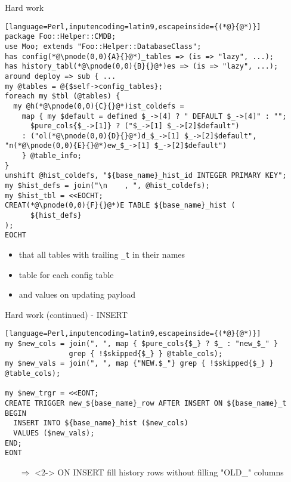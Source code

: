 \documentclass[ngerman,xcolor={table,dvipsnames},smaller,compress,hyperref={bookmarks,colorlinks}]{beamer}%
\begin{document}
\begin{frame}[fragile]{}
\begin{block}{Hard work}
\scriptsize
\begin{lstlisting}[language=Perl,inputencoding=latin9,escapeinside={(*@}{@*)}]
package Foo::Helper::CMDB;
use Moo; extends "Foo::Helper::DatabaseClass";
has config(*@\pnode(0,0){A}{}@*)_tables => (is => "lazy", ...);
has history_tabl(*@\pnode(0,0){B}{}@*)es => (is => "lazy", ...);
around deploy => sub { ...
my @tables = @{$self->config_tables};
foreach my $tbl (@tables) {
  my @h(*@\pnode(0,0){C}{}@*)ist_coldefs =
    map { my $default = defined $_->[4] ? " DEFAULT $_->[4]" : "";
      $pure_cols{$_->[1]} ? ("$_->[1] $_->[2]$default")
	: ("ol(*@\pnode(0,0){D}{}@*)d_$_->[1] $_->[2]$default", "n(*@\pnode(0,0){E}{}@*)ew_$_->[1] $_->[2]$default")
    } @table_info;
}
unshift @hist_coldefs, "${base_name}_hist_id INTEGER PRIMARY KEY";
my $hist_defs = join("\n    , ", @hist_coldefs);
my $hist_tbl = <<EOCHT;
CREAT(*@\pnode(0,0){F}{}@*)E TABLE ${base_name}_hist (
      ${hist_defs}
);
EOCHT
\end{lstlisting}
\end{block}

\begin{itemize}
\item<2-> that  all tables with trailing \texttt{\_t} in their names
\item<3->   table for each config table
\item<4->   and  values on updating payload
\end{itemize}
\end{frame}

\begin{frame}[fragile]{}
\begin{block}{Hard work (continued) - INSERT}
\scriptsize
\begin{lstlisting}[language=Perl,inputencoding=latin9,escapeinside={(*@}{@*)}]
my $new_cols = join(", ", map { $pure_cols{$_} ? $_ : "new_$_" }
               grep { !$skipped{$_} } @table_cols);
my $new_vals = join(", ", map {"NEW.$_"} grep { !$skipped{$_} } @table_cols);

my $new_trgr = <<EONT;
CREATE TRIGGER new_${base_name}_row AFTER INSERT ON ${base_name}_t
BEGIN
  INSERT INTO ${base_name}_hist ($new_cols)
  VALUES ($new_vals);
END;
EONT
\end{lstlisting}
\end{block}


\begin{itemize}
\item[$\Rightarrow$]<2-> ON INSERT fill history rows without filling "OLD\_" columns
\end{itemize}
\end{frame}
\end{document}
